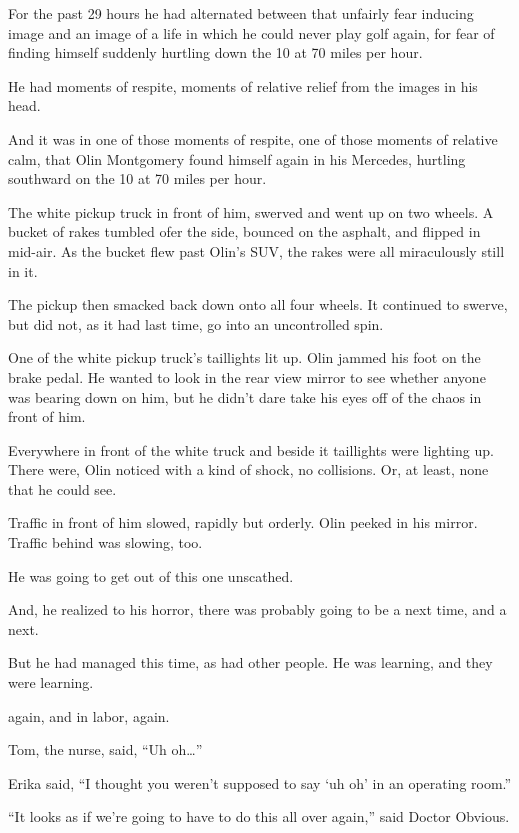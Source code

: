 For the past 29 hours he had alternated between that unfairly fear inducing image and an image of a life in which he could never play golf again, for fear of finding himself suddenly hurtling down the 10 at 70 miles per hour.

He had moments of respite, moments of relative relief from the images in his head.

And it was in one of those moments of respite, one of those moments of relative calm, that Olin Montgomery found himself again in his Mercedes, hurtling southward on the 10 at 70 miles per hour.

The white pickup truck in front of him, swerved and went up on two wheels. A bucket of rakes tumbled ofer the side, bounced on the asphalt, and flipped in mid-air. As the bucket flew past Olin’s SUV, the rakes were all miraculously still in it.

The pickup then smacked back down onto all four wheels. It continued to swerve, but did not, as it had last time, go into an uncontrolled spin.

One of the white pickup truck’s taillights lit up. Olin jammed his foot on the brake pedal. He wanted to look in the rear view mirror to see whether anyone was bearing down on him, but he didn’t dare take his eyes off of the chaos in front of him.

Everywhere in front of the white truck and beside it taillights were lighting up. There were, Olin noticed with a kind of shock, no collisions. Or, at least, none that he could see.

Traffic in front of him slowed, rapidly but orderly. Olin peeked in his mirror. Traffic behind was slowing, too.

He was going to get out of this one unscathed.

And, he realized to his horror, there was probably going to be a next time, and a next.

But he had managed this time, as had other people. He was learning, and they were learning.




 again, and in labor, again.

Tom, the nurse, said, “Uh oh…”

Erika said, “I thought you weren’t supposed to say `uh oh’ in an operating room.”

“It looks as if we’re going to have to do this all over again,” said Doctor Obvious.

